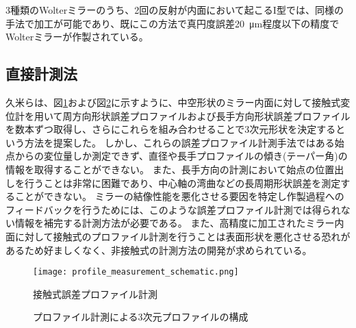 3種類のWolterミラーのうち、2回の反射が内面において起こるI型では、同様の手法で加工が可能であり、既にこの方法で真円度誤差\SI{20}{\micro \metre}程度以下の精度でWolterミラーが作製されている。\cite{Yamaguchi2020}

\subsection{直接計測法}
\label{chap1_direct_measurement}

久米らは、図\ref{fig:profile_measurement_schematic}および図\ref{fig:profile_measurement}に示すように、中空形状のミラー内面に対して接触式変位計を用いて周方向形状誤差プロファイルおよび長手方向形状誤差プロファイルを数本ずつ取得し、さらにこれらを組み合わせることで3次元形状を決定するという方法を提案した。\cite{Kume2017}
しかし、これらの誤差プロファイル計測手法ではある始点からの変位量しか測定できず、直径や長手プロファイルの傾き(テーパー角)の情報を取得することができない。
また、長手方向の計測において始点の位置出しを行うことは非常に困難であり、中心軸の湾曲などの長周期形状誤差を測定することができない。
ミラーの結像性能を悪化させる要因を特定し作製過程へのフィードバックを行うためには、このような誤差プロファイル計測では得られない情報を補完する計測方法が必要である。
また、高精度に加工されたミラー内面に対して接触式のプロファイル計測を行うことは表面形状を悪化させる恐れがあるため好ましくなく、非接触式の計測方法の開発が求められている。

\begin{figure}[h]
\centering
\texttt{[image: profile\_measurement\_schematic.png]}
\caption{接触式誤差プロファイル計測}
\label{fig:profile_measurement_schematic}
\end{figure}

\begin{figure}[!ht]
\centering
{}
\caption[]{プロファイル計測による3次元プロファイルの構成}
\label{fig:profile_measurement}
\end{figure}


\clearpage
\newpage
